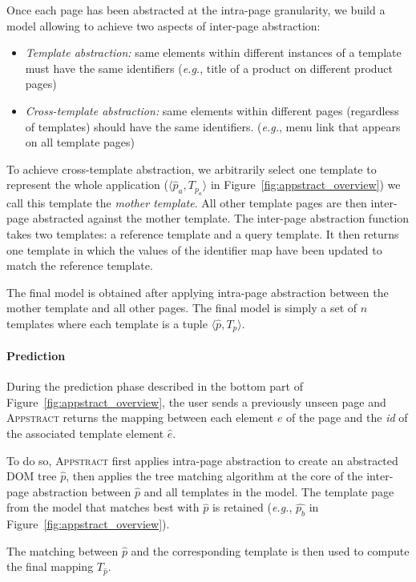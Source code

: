Once each page has been abstracted at the intra-page granularity, we build a model allowing to achieve two aspects of inter-page abstraction:
\begin{itemize}
    \item \textit{Template abstraction:} same elements within different instances of a template must have the same identifiers (\emph{e.g.}, title of a product on different product pages)
    \item \textit{Cross-template abstraction:} same elements within different pages (regardless of templates) should have the same identifiers. (\emph{e.g.}, menu link that appears on all template pages)
\end{itemize}

To achieve cross-template abstraction, we arbitrarily select one template to represent the whole application ($\langle \hat{p}_a, T_{p_a} \rangle$ in Figure~\ref{fig:appstract_overview}) we call this template the \textit{mother template}.
All other template pages are then inter-page abstracted against the mother template. 
The inter-page abstraction function takes two templates: a reference template and a query template. It then returns one template in which the values of the identifier map have been updated to match the reference template.

The final model is obtained after applying intra-page abstraction between the mother template and all other pages.
The final model is simply a set of $n$ templates where each template is a tuple $\langle \hat{p}, T_{p} \rangle$.

\paragraph{Prediction}
During the prediction phase described in the bottom part of Figure~\ref{fig:appstract_overview}, the user sends a previously unseen page and \textsc{Appstract} returns the mapping between each element $e$ of the page and the \textit{id} of the associated template element $\hat{e}$.

To do so, \textsc{Appstract} first applies intra-page abstraction to create an abstracted DOM tree $\hat{p}$, then applies the tree matching algorithm at the core of the inter-page abstraction between $\hat{p}$ and all templates in the model.
The template page from the model that matches best with $\hat{p}$ is retained (\emph{e.g.}, $\hat{p_b}$ in Figure~\ref{fig:appstract_overview}).

The matching between $\hat{p}$ and the corresponding template is then used to compute the final mapping $T_{\hat{p}}$.


